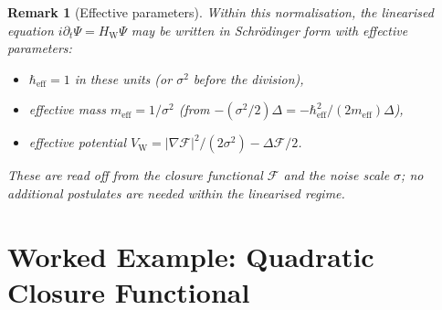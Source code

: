 \documentclass[12pt]{article}
\newtheorem{remark}[theorem]{Remark}
\newcommand{\Fcal}{\mathcal{F}}
\newcommand{\VW}{V_{\mathrm{W}}}
\begin{document}
\begin{remark}[Effective parameters]\label{rem:parameters}
Within this normalisation, the linearised equation $i\partial_t\Psi = H_{\mathrm{W}}\Psi$ may be written in Schr\"odinger form with effective parameters:
\begin{itemize}
    \item $\hbar_{\mathrm{eff}} = 1$ in these units (or $\sigma^2$ before the division),
    \item effective mass $m_{\mathrm{eff}} = 1/\sigma^2$ (from $-(\sigma^2/2)\Delta = -\hbar_{\mathrm{eff}}^2/(2m_{\mathrm{eff}})\Delta$),
    \item effective potential $\VW = |\nabla\Fcal|^2/(2\sigma^2) - \Delta\Fcal/2$.
\end{itemize}
These are read off from the closure functional $\Fcal$ and the noise scale $\sigma$; no additional postulates are needed within the linearised regime.
\end{remark}

\section{Worked Example: Quadratic Closure Functional}\label{sec:example}
\end{document}
